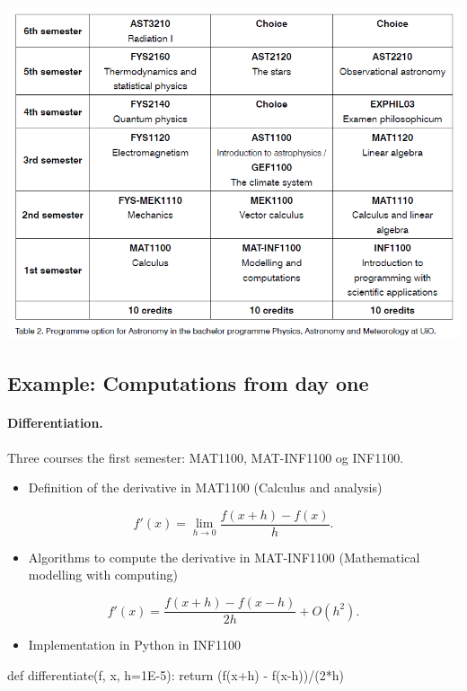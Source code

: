 \documentclass[%
twoside,                 %
final,                   %
10pt]{article}
\begin{document}
\paragraph{}


\centerline{\includegraphics[width=0.6\linewidth]{figures/astronomy.png}}




\subsection{Example: Computations from day one}

\paragraph{Differentiation.}
Three courses the first semester:  MAT1100, MAT-INF1100 og INF1100.
\begin{itemize}
\item Definition  of the derivative in  MAT1100 (Calculus and analysis) 
\end{itemize}

\noindent
\[
 f'(x)=\lim_{h \rightarrow 0}\frac{f(x+h)-f(x)}{h}.
\]
\begin{itemize}
\item Algorithms to compute the derivative in MAT-INF1100  (Mathematical modelling with computing)
\end{itemize}

\noindent
\[
 f'(x)= \frac{f(x+h)-f(x-h)}{2h}+O(h^2).
\]
\begin{itemize}
\item Implementation in Python in INF1100
\end{itemize}

\noindent
\bpycod
def differentiate(f, x, h=1E-5):
     return (f(x+h) - f(x-h))/(2*h)
\epycod
\end{document}
